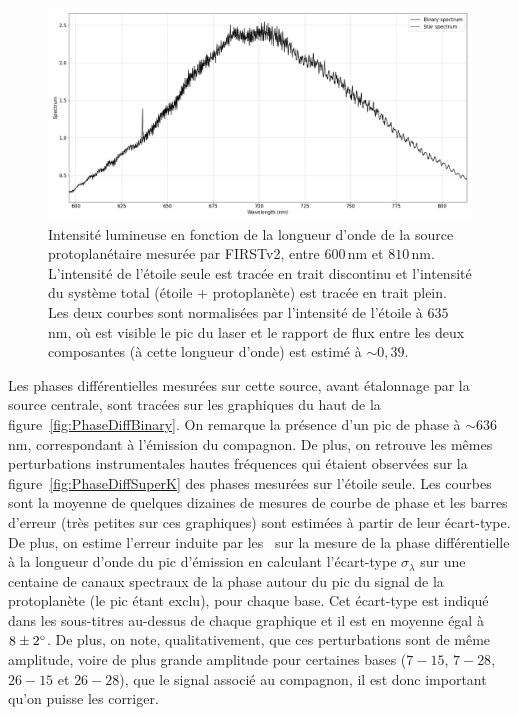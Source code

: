 \begin{figure}[ht!]
    \centering
    \includegraphics[width=\figwidth]{Figure_Chap4/20221010_Bin01_Spectra_superK_laser635_Pola1_LaTex.png}
    \caption[Intensité lumineuse en fonction de la longueur d'onde de la source protoplanétaire mesurée par FIRSTv2.]{Intensité lumineuse en fonction de la longueur d'onde de la source protoplanétaire mesurée par FIRSTv2, entre $600 \,$nm et $810 \,$nm. L'intensité de l'étoile seule est tracée en trait discontinu et l'intensité du système total (étoile + protoplanète) est tracée en trait plein. Les deux courbes sont normalisées par l'intensité de l'étoile à $635 \,$nm, où est visible le pic du laser et le rapport de flux entre les deux composantes (à cette longueur d'onde) est estimé à $\sim 0,39$.}
    \label{fig:BinarySpectrum}
\end{figure}

Les phases différentielles mesurées sur cette source, avant étalonnage par la source centrale, sont tracées sur les graphiques du haut de la figure~\ref{fig:PhaseDiffBinary}. On remarque la présence d'un pic de phase à $\sim 636 \,$nm, correspondant à l'émission du compagnon. De plus, on retrouve les mêmes perturbations instrumentales hautes fréquences qui étaient observées sur la figure~\ref{fig:PhaseDiffSuperK} des phases mesurées sur l'étoile seule. Les courbes sont la moyenne de quelques dizaines de mesures de courbe de phase et les barres d'erreur (très petites sur ces graphiques) sont estimées à partir de leur écart-type. De plus, on estime l'erreur induite par les \wiggles~sur la mesure de la phase différentielle à la longueur d'onde du pic d'émission en calculant l'écart-type $\sigma_{\lambda}$ sur une centaine de canaux spectraux de la phase autour du pic du signal de la protoplanète (le pic étant exclu), pour chaque base. Cet écart-type est indiqué dans les sous-titres au-dessus de chaque graphique et il est en moyenne égal à $8 \pm 2^{\circ}$. De plus, on note, qualitativement, que ces perturbations sont de même amplitude, voire de plus grande amplitude pour certaines bases ($7-15$, $7-28$, $26-15$ et $26-28$), que le signal associé au compagnon, il est donc important qu'on puisse les corriger.

